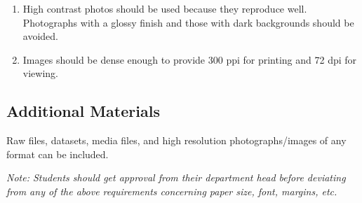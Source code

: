 \begin{enumerate}
  \item High contrast photos should be used because they reproduce well. Photographs with a glossy finish and those with dark backgrounds should be avoided.
  \item Images should be dense enough to provide 300 ppi for printing and 72 dpi for viewing.
\end{enumerate}

\subsection{Additional Materials}

Raw files, datasets, media files, and high resolution photographs/images of any format can be included.

\emph{Note: Students should get approval from their department head before deviating from any of the above requirements concerning paper size, font, margins, etc. }

